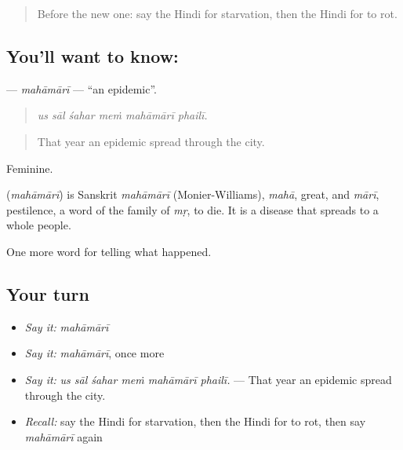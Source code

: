 \label{lesson:HI-C306-mahamari}



\begin{quote}
Before the new one: say the Hindi for starvation, then the Hindi for to rot.
\end{quote}

\subsection*{You'll want to know: }
\textbf{} — \emph{mahāmārī} — \textquotedblleft{}an epidemic\textquotedblright{}.

\begin{quote}
     
\end{quote}

\begin{quote}
\emph{us sāl śahar meṁ mahāmārī phailī.}
\end{quote}

\begin{quote}
That year an epidemic spread through the city.
\end{quote}

Feminine.

\begin{cousinweb}
\textbf{} (\emph{mahāmārī}) is Sanskrit \emph{mahāmārī} (Monier-Williams), \emph{mahā}, great, and \emph{mārī}, pestilence, a word of the family of \emph{mṛ}, to die. It is a disease that spreads to a whole people.
\end{cousinweb}

\begin{grammarlens}[title={What you've built}]
One more word for telling what happened.
\end{grammarlens}

\subsection*{Your turn}
\begin{itemize}
\raggedright
  \item \emph{Say it:} \emph{mahāmārī}
  \item \emph{Say it:} \emph{mahāmārī}, once more
  \item \emph{Say it:} \emph{us sāl śahar meṁ mahāmārī phailī.} — That year an epidemic spread through the city.
  \item \emph{Recall:} say the Hindi for starvation, then the Hindi for to rot, then say \emph{mahāmārī} again
\end{itemize}

